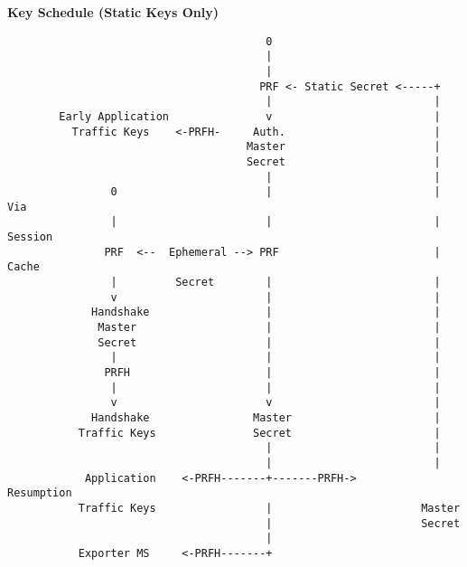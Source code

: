 \documentclass[helvetica]{seminar}
\newcommand{\heading}[1]{%
  \begin{center} 
    \large\bf 
    #1 
  \end{center} 
  \vspace{.4 in}}
\begin{document}
\begin{slide}
\heading{Key Schedule (Static Keys Only)}

\vspace{-.45in}
{\tiny
\begin{verbatim}
                                        0
                                        |                         
                                        |                         
                                       PRF <- Static Secret <-----+
                                        |                         |
        Early Application               v                         |
          Traffic Keys    <-PRFH-     Auth.                       |
                                     Master                       |
                                     Secret                       |
                                        |                         |
                0                       |                         | Via
                |                       |                         | Session
               PRF  <--  Ephemeral --> PRF                        | Cache
                |         Secret        |                         |
                v                       |                         |
             Handshake                  |                         |
              Master                    |                         |
              Secret                    |                         |
                |                       |                         |
               PRFH                     |                         |
                |                       |                         |
                v                       v                         |
             Handshake                Master                      |
           Traffic Keys               Secret                      |
                                        |                         |
                                        |                         |
            Application    <-PRFH-------+-------PRFH->        Resumption        
           Traffic Keys                 |                       Master
                                        |                       Secret  
                                        |
           Exporter MS     <-PRFH-------+
\end{verbatim}
}

\end{slide}
\end{document}
